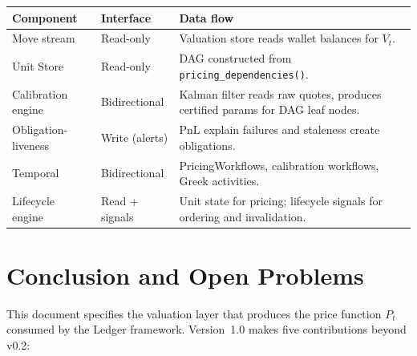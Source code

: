 \documentclass[11pt,a4paper]{article}
\begin{document}
\begin{center}
\small
\begin{tabular}{l p{3.5cm} p{6.5cm}}
\toprule
\textbf{Component} & \textbf{Interface} & \textbf{Data flow} \\
\midrule
Move stream~\cite[\S8]{ledger} & Read-only & Valuation store reads wallet balances for $V_t$. \\
Unit Store~\cite[\S3]{ledger} & Read-only & DAG constructed from \texttt{pricing\_dependencies()}. \\
Calibration engine & Bidirectional & Kalman filter reads raw quotes, produces certified params for DAG leaf nodes. \\
Obligation-liveness~\cite[\S14.7]{ledger} & Write (alerts) & PnL explain failures and staleness create obligations. \\
Temporal~\cite[\S14]{ledger} & Bidirectional & PricingWorkflows, calibration workflows, Greek activities. \\
Lifecycle engine~\cite[\S7]{ledger} & Read + signals & Unit state for pricing; lifecycle signals for ordering and invalidation. \\
\bottomrule
\end{tabular}
\end{center}

\clearpage
\section{Conclusion and Open Problems}
\label{sec:conclusion}

This document specifies the valuation layer that produces the price function $P_t$ consumed by the Ledger framework.  Version~1.0 makes five contributions beyond v0.2:
\end{document}
